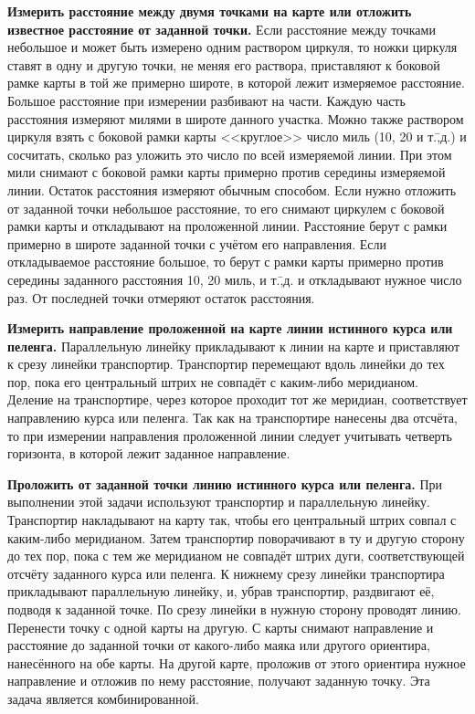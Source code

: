 \textbf{Измерить расстояние между двумя точками на карте или отложить
  известное расстояние от заданной точки.} Если расстояние между
точками небольшое и может быть измерено одним раствором циркуля, то
ножки циркуля ставят в одну и другую точки, не меняя его раствора,
приставляют к боковой рамке карты в той же примерно широте, в которой
лежит измеряемое расстояние. Большое расстояние при измерении
разбивают на части. Каждую часть расстояния измеряют милями в широте
данного участка. Можно также раствором циркуля взять с боковой рамки
карты <<круглое>> число миль (10, 20 и т.\=,д.) и сосчитать, сколько
раз уложить это число по всей измеряемой линии. При этом мили снимают
с боковой рамки карты примерно против середины измеряемой
линии. Остаток расстояния измеряют обычным способом. Если нужно
отложить от заданной точки небольшое расстояние, то его снимают
циркулем с боковой рамки карты и откладывают на проложенной
линии. Расстояние берут с рамки примерно в широте заданной точки с
учётом его направления. Если откладываемое расстояние большое, то
берут с рамки карты примерно против середины заданного расстояния 10,
20 миль, и т.\=,д. и откладывают нужное число раз. От последней точки
отмеряют остаток расстояния.
 
\textbf{Измерить направление проложенной на карте линии истинного
  курса или пеленга.} Параллельную линейку прикладывают к линии на
карте и приставляют к срезу линейки транспортир. Транспортир
перемещают вдоль линейки до тех пор, пока его центральный штрих не
совпадёт с каким-либо меридианом. Деление на транспортире, через
которое проходит тот же меридиан, соответствует направлению курса или
пеленга. Так как на транспортире нанесены два отсчёта, то при
измерении направления проложенной линии следует учитывать четверть
горизонта, в которой лежит заданное направление.

\textbf{Проложить от заданной точки линию истинного курса или
  пеленга.} При выполнении этой задачи используют транспортир и
параллельную линейку. Транспортир накладывают на карту так, чтобы его
центральный штрих совпал с каким-либо меридианом. Затем транспортир
поворачивают в ту и другую сторону до тех пор, пока с тем же
меридианом не совпадёт штрих дуги, соответствующей отсчёту заданного
курса или пеленга. К нижнему срезу линейки транспортира прикладывают
параллельную линейку, и, убрав транспортир, раздвигают её, подводя к
заданной точке. По срезу линейки в нужную сторону проводят
линию. Перенести точку с одной карты на другую. С карты снимают
направление и расстояние до заданной точки от какого-либо маяка или
другого ориентира, нанесённого на обе карты. На другой карте, проложив
от этого ориентира нужное направление и отложив по нему расстояние,
получают заданную точку. Эта задача является комбинированной.


